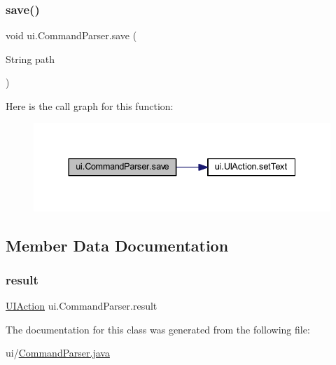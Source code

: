 \mbox{\label{classui_1_1_command_parser_a72ac4304e38b2ac30f642388d6fe6bff}} 
\subsubsection{\texorpdfstring{save()}{save()}}
{\footnotesize\ttfamily void ui.\+Command\+Parser.\+save (\begin{DoxyParamCaption}\item[{String}]{path }\end{DoxyParamCaption})\hspace{0.3cm}{\ttfamily [inline]}}

Here is the call graph for this function\+:
\nopagebreak
\begin{figure}[H]
\begin{center}
\leavevmode
\includegraphics[width=337pt]{classui_1_1_command_parser_a72ac4304e38b2ac30f642388d6fe6bff_cgraph}
\end{center}
\end{figure}


\subsection{Member Data Documentation}
\mbox{\label{classui_1_1_command_parser_a9c3ed16be5749302a44b7d15a7c860a7}} 
\subsubsection{\texorpdfstring{result}{result}}
{\footnotesize\ttfamily \mbox{\hyperlink{classui_1_1_u_i_action}{U\+I\+Action}} ui.\+Command\+Parser.\+result\hspace{0.3cm}{\ttfamily [private]}}



The documentation for this class was generated from the following file\+:\begin{DoxyCompactItemize}
\item 
ui/\mbox{\hyperlink{_command_parser_8java}{Command\+Parser.\+java}}\end{DoxyCompactItemize}
